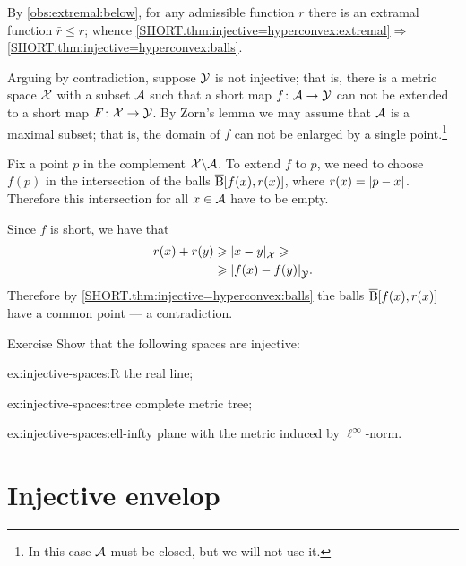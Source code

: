 By \ref{obs:extremal:below}, for any admissible function $r$ there is an extramal function $\bar r\le r$;
whence \ref{SHORT.thm:injective=hyperconvex:extremal}$\Rightarrow$\ref{SHORT.thm:injective=hyperconvex:balls}.

Arguing by contradiction, suppose $\mathcal{Y}$ is not injective;
that is, there is a metric space $\mathcal{X}$ with a subset $\mathcal{A}$
such that a short map $f\colon\mathcal{A}\to \mathcal{Y}$ can not be extended to a short map $F\colon\mathcal{X}\to \mathcal{Y}$.
By Zorn's lemma we may assume that $\mathcal{A}$ is a maximal subset; that is, the domain of $f$ can not be enlarged by a single point.\footnote{In this case $\mathcal{A}$ must be closed, but we will not use it.}

Fix a point $p$ in the complement $\mathcal{X}\backslash \mathcal{A}$.
To extend $f$ to $p$, we need to choose $f(p)$ in the intersection of the balls 
$\overline{\mathrm{B}}{}[f(x),r(x)]$, where $r(x)=\dist{p}{x}{}$.
Therefore this intersection for all $x\in \mathcal{A}$ have to be empty.

Since $f$ is short, we have that 
\begin{align*}
r(x)+r(y)&\ge \dist{x}{y}{\spc{X}}\ge
\\
&\ge \dist{f(x)}{f(y)}{\spc{Y}}.
\end{align*}
Therefore by \ref{SHORT.thm:injective=hyperconvex:balls} the balls 
$\overline{\mathrm{B}}{}[f(x),r(x)]$ have a common point --- a contradiction. 
\qeds

\begin{thm}{Exercise}\label{ex:injective-spaces}
Show that the following spaces are injective:
\begin{subthm}{ex:injective-spaces:R}
the real line;
\end{subthm}

\begin{subthm}{ex:injective-spaces:tree}
complete metric tree;
\end{subthm}

\begin{subthm}{ex:injective-spaces:ell-infty}
plane with the metric induced by $\ell^\infty$-norm.
\end{subthm}

\end{thm}

\section{Injective envelop}

